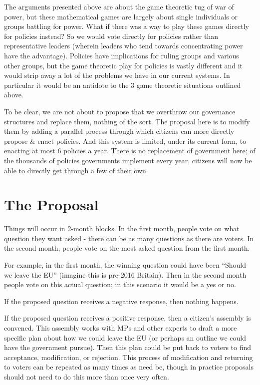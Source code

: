 \documentclass[twoside]{article}
\theoremstyle{definition}
\begin{document}
The arguments presented above are about the game theoretic tug of war of power, but these mathematical games are largely about single individuals or groups battling for power. What if there was a way to play these games directly for policies instead? So we would vote directly for policies rather than representative leaders (wherein leaders who tend towards concentrating power have the advantage). Policies have implications for ruling groups and various other groups, but the game theoretic play for policies is vastly different and it would strip away a lot of the problems we have in our current systems. In particular it would be an antidote to the 3 game theoretic situations outlined above.

To be clear, we are not about to propose that we overthrow our governance structures and replace them, nothing of the sort. The proposal here is to modify them by adding a parallel process through which citizens can more directly propose \& enact policies. And this system is limited, under its current form, to enacting at most 6 policies a year. There is no replacement of government here; of the thousands of policies governments implement every year, citizens will now be able to directly get through a few of their own.

\section{The Proposal}

Things will occur in 2-month blocks. In the first month, people vote on what question they want asked - there can be as many questions as there are voters. In the second month, people vote on the most asked question from the first month.

For example, in the first month, the winning question could have been “Should we leave the EU” (imagine this is pre-2016 Britain). Then in the second month people vote on this actual question; in this scenario it would be a yes or no.

If the proposed question receives a negative response, then nothing happens.

If the proposed question receives a positive response, then a citizen’s assembly is convened. This assembly works with MPs and other experts to draft a more specific plan about how we could leave the EU (or perhaps an outline we could have the government pursue). Then this plan could be put back to voters to find acceptance, modification, or rejection. This process of modification and returning to voters can be repeated as many times as need be, though in practice proposals should not need to do this more than once very often.
\end{document}
